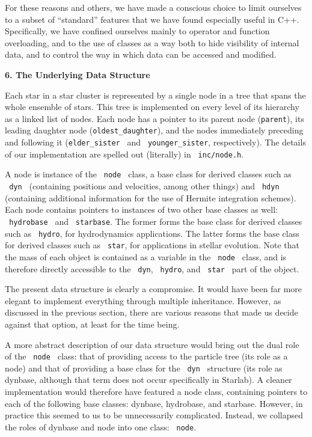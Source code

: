 For these reasons and others, we have made a conscious choice to limit
ourselves to a subset of ``standard'' features that we have found
especially useful in C++.  Specifically, we have confined ourselves
mainly to operator and function overloading, and to the use of classes
as a way both to hide visibility of internal data, and to control the
way in which data can be accessed and modified.

\null\bigskip
\centerline{\bf 6. The Underlying Data Structure}
\medskip

Each star in a star cluster is represented by a single node in a tree
that spans the whole ensemble of stars.  This tree is implemented on
every level of its hierarchy as a linked list of nodes.  Each node has
a pointer to its parent node ({\tt parent}), its leading daughter
node ({\tt oldest\_daughter}), and the nodes immediately preceding
and following it ({\tt elder\_sister\ } and {\tt\ younger\_sister},
respectively).  The details of our implementation are spelled out
(literally) in {\tt\ inc/node.h}.

A node is instance of the {\tt\ node\ } class, a base class for
derived classes such as {\tt\ dyn\ } (containing positions and
velocities, among other things) and {\tt\ hdyn\ } (containing
additional information for the use of Hermite integration schemes).
Each node contains pointers to instances of two other base classes as
well: {\tt\ hydrobase\ } and {\tt\ starbase}.  The former forms the
base class for derived classes such as {\tt\ hydro}, for hydrodynamics
applications.  The latter forms the base class for derived classes
such as {\tt\ star}, for applications in stellar evolution.  Note that
the mass of each object is contained as a variable in the {\tt\ node\
} class, and is therefore directly accessible to the {\tt\ dyn}, {\tt\
hydro}, and {\tt\ star\ } part of the object.


The present data structure is clearly a compromise.  It would have
been far more elegant to implement everything through multiple
inheritance.  However, as discussed in the previous section, there are
various reasons that made us decide against that option, at least for
the time being.

A more abstract description of our data structure would bring out the
dual role of the {\tt\ node\ } class: that of providing access to the
particle tree (its role as a node) and that of providing a base class
for the {\tt\ dyn\ } structure (its role as dynbase, although that
term does not occur specifically in Starlab).  A cleaner
implementation would therefore have featured a node class, containing
pointers to each of the following base classes: dynbase, hydrobase,
and starbase.  However, in practice this seemed to us to be
unnecessarily complicated.  Instead, we collapsed the roles of dynbase
and node into one class: {\tt\ node}.

